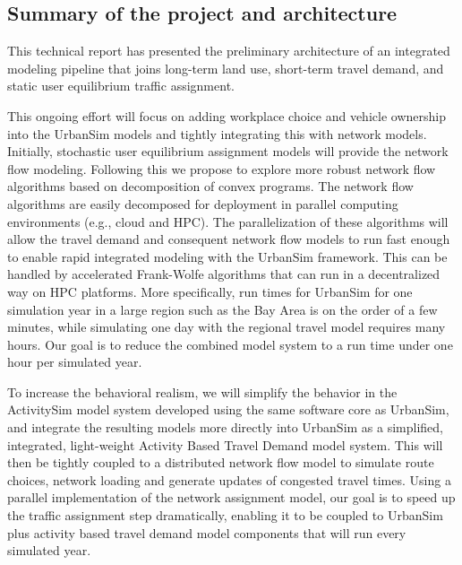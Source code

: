 \subsection{Summary of the project and architecture}

This technical report has presented the preliminary architecture of an integrated modeling pipeline that joins long-term land use, short-term travel demand, and static user equilibrium traffic assignment.

This ongoing effort will focus on adding workplace choice and vehicle ownership into the UrbanSim models and tightly integrating this with network models. Initially, stochastic user equilibrium assignment models will provide the network flow modeling. Following this we propose to explore more robust network flow algorithms based on decomposition of convex programs. The network flow algorithms are easily decomposed for deployment in parallel computing environments (e.g., cloud and HPC). The parallelization of these algorithms will allow the travel demand and consequent network flow models to run fast enough to enable rapid integrated modeling with the UrbanSim framework. This can be handled by accelerated Frank-Wolfe algorithms that can run in a decentralized way on HPC platforms. More specifically, run times for UrbanSim for one simulation year in a large region such as the Bay Area is on the order of a few minutes, while simulating one day with the regional travel model requires many hours. Our goal is to reduce the combined model system to a run time under one hour per simulated year.

To increase the behavioral realism, we will simplify the behavior in the ActivitySim model system developed using the same software core as UrbanSim, and integrate the resulting models more directly into UrbanSim as a simplified, integrated, light-weight Activity Based Travel Demand model system. This will then be tightly coupled to a distributed network flow model to simulate route choices, network loading and generate updates of congested travel times. Using a parallel implementation of the network assignment model, our goal is to speed up the traffic assignment step dramatically, enabling it to be coupled to UrbanSim plus activity based travel demand model components that will run every simulated year.

